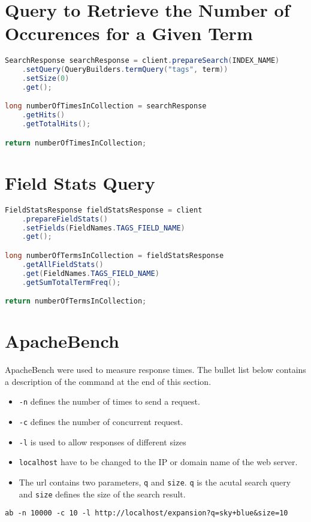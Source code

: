 \section{Query to Retrieve the Number of Occurences for a Given Term}
\begin{lstlisting}[language={java}, caption={Java code used retrieve the number of occurences for a given term in the collection.}, label={ap:number-of-occurences-query}]
SearchResponse searchResponse = client.prepareSearch(INDEX_NAME)
    .setQuery(QueryBuilders.termQuery("tags", term))
    .setSize(0)
    .get();

long numberOfTimesInCollection = searchResponse
    .getHits()
    .getTotalHits();

return numberOfTimesInCollection;
\end{lstlisting}

\section{Field Stats Query}
\begin{lstlisting}[language={java}, caption={Java code used retrieve the total number of terms in a field in the collection.}, label={ap:field-stasts-query}]
FieldStatsResponse fieldStatsResponse = client
    .prepareFieldStats()
    .setFields(FieldNames.TAGS_FIELD_NAME)
    .get();

long numberOfTermsInCollection = fieldStatsResponse
    .getAllFieldStats()
    .get(FieldNames.TAGS_FIELD_NAME)
    .getSumTotalTermFreq();

return numberOfTermsInCollection;
\end{lstlisting}

\section{ApacheBench}
\label{ap:apache-benchmark}

ApacheBench \cite{apache-benchmark} were used to measure response times.
The bullet list below contains a description of the command at the end of this section.

\begin{itemize}
  \item \texttt{-n} defines the number of times to send a request.
  \item \texttt{-c} defines the number of concurrent request.
  \item \texttt{-l} is used to allow responses of different sizes
  \item \texttt{localhost} have to be changed to the IP or domain name of the web server.
  \item The url contains two parameters, \texttt{q} and \texttt{size}.
  \texttt{q} is the acutal search query and \texttt{size} defines the size of the search result.
\end{itemize}

\texttt{ab -n 10000 -c 10 -l http://localhost/expansion?q=sky+blue\&size=10}
